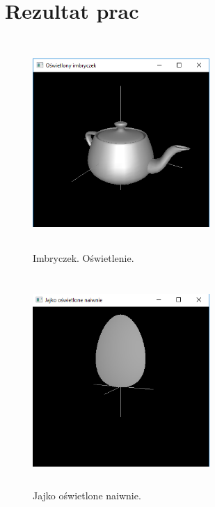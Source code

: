 \documentclass[polish,polish,a4paper]{article}
\begin{document}
  \section{Rezultat prac}

    \begin{figure}[h!]
      \centering
      \includegraphics[width=0.6\textwidth,height=8cm]{imbryczek.png}
      \caption{Imbryczek. Oświetlenie.}
      \label{fig:zrzut1}
    \end{figure}

    \begin{figure}[h!]
      \centering
      \includegraphics[width=0.6\textwidth,height=8cm]{jajkonaiwnie.png}
      \caption{Jajko oświetlone naiwnie.}
      \label{fig:zrzut1}
    \end{figure}
\end{document}
